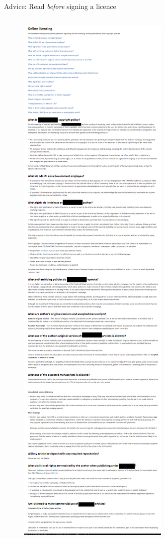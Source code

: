 \documentclass[10pt]{beamer}
\begin{document}
\begin{frame}{Advice: Read \emph{before} signing a licence}
\begin{columns}
\begin{column}{0.2\linewidth}
\begin{figure}
			\includegraphics[trim={10pt 0pt 20pt 0pt}, clip, width=\columnwidth]{images/licence}
		\end{figure}
    \end{column}
\end{columns}
\end{frame}
\end{document}
